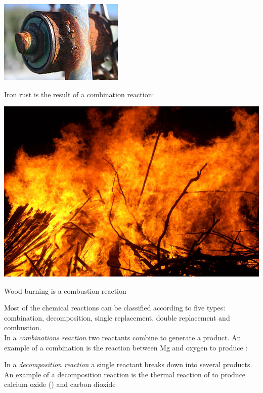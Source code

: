 \documentclass[main.tex]{subfiles}
\begin{document}
\begin{description}
\begin{marginfigure}[-5cm]%
      \includegraphics{chapter7/figure9}
      \caption{Iron rust is the result of a combination reaction: }
	\end{marginfigure}%
\begin{marginfigure}[1cm]%
      \includegraphics{chapter7/figure10}
      \caption{Wood burning is a combustion reaction}
	\end{marginfigure}%
\item[\docfilehook{Five types of reactions}{Five types of reactions}]
Most of the chemical reactions can be classified according to five types: combination, decomposition, single replacement, double replacement and combustion. \\
In a \emph{combinations reaction} two reactants combine to generate a product. An example of a combination is the reaction between Mg and oxygen to produce :
\begin{center}\end{center}
In a \emph{decomposition reaction} a single reactant breaks down into several products. An example of a decomposition reaction is the thermal reaction of  to produce calcium oxide () and carbon dioxide

\end{description}
\end{document}
